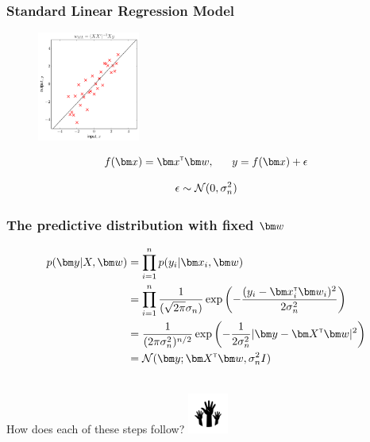 
\begin{frame}
\frametitle{Standard Linear Regression Model}
\begin{figure}
    \includegraphics[width=0.3\textwidth]{images/plots/w_space_maximum_likelihood_002.pdf}
\end{figure}

\renewcommand\theequation{2.\thedefcounter}
\setcounter{defcounter}{1}
\begin{equation}
f(\bx) = \bx\transpose \bw,~~~~~y = f(\bx) + \epsilon
\end{equation}

\setcounter{defcounter}{2}
\begin{equation}
\epsilon \sim {\mathcal{N}}(0, \sigma_n^2)
\end{equation}

\end{frame}


\begin{frame}
\frametitle{The predictive distribution with fixed $\bw$}

\renewcommand\theequation{2.\thedefcounter}
\setcounter{defcounter}{3}
\begin{align}
p(\by | X, \bw) &= \prod_{i=1}^{n} p(y_i | \bx_i, \bw) \nonumber \\
                &= \prod_{i=1}^{n} \frac{1}{(\sqrt{2\pi}\sigma_n)} \exp{\left( -\frac{(y_i - \bx_i\transpose\bw_i)^2}{2 \sigma_n^2} \right) } \nonumber \\
                &= \frac{1}{(2\pi\sigma_n^2)^{n/2}} \exp{\left( -\frac{1}{2\sigma_n^2} | \by - \bX\transpose\bw |^2 \right)} \nonumber \\
                &= \norm(\by; \bX\transpose\bw, \sigma_n^2I)
\end{align}

~\\
How does each of these steps follow? 	\includegraphics[width=0.1\textwidth]{images/hands.png}

\end{frame}


